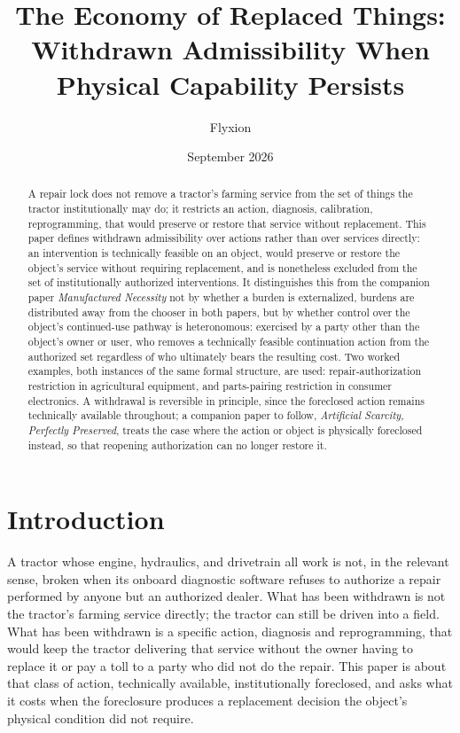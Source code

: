 \documentclass[11pt]{article}
\title{The Economy of Replaced Things: Withdrawn Admissibility When Physical Capability Persists}
\author{Flyxion}
\affil{Independent Researcher}
\date{September 2026}
\begin{document}
\maketitle

\begin{abstract}
A repair lock does not remove a tractor's farming service from the set of things the tractor institutionally may do; it restricts an action, diagnosis, calibration, reprogramming, that would preserve or restore that service without replacement. This paper defines withdrawn admissibility over actions rather than over services directly: an intervention is technically feasible on an object, would preserve or restore the object's service without requiring replacement, and is nonetheless excluded from the set of institutionally authorized interventions. It distinguishes this from the companion paper \emph{Manufactured Necessity} not by whether a burden is externalized, burdens are distributed away from the chooser in both papers, but by whether control over the object's continued-use pathway is heteronomous: exercised by a party other than the object's owner or user, who removes a technically feasible continuation action from the authorized set regardless of who ultimately bears the resulting cost. Two worked examples, both instances of the same formal structure, are used: repair-authorization restriction in agricultural equipment, and parts-pairing restriction in consumer electronics. A withdrawal is reversible in principle, since the foreclosed action remains technically available throughout; a companion paper to follow, \emph{Artificial Scarcity, Perfectly Preserved}, treats the case where the action or object is physically foreclosed instead, so that reopening authorization can no longer restore it.
\end{abstract}

\section{Introduction}

A tractor whose engine, hydraulics, and drivetrain all work is not, in the relevant sense, broken when its onboard diagnostic software refuses to authorize a repair performed by anyone but an authorized dealer. What has been withdrawn is not the tractor's farming service directly; the tractor can still be driven into a field. What has been withdrawn is a specific action, diagnosis and reprogramming, that would keep the tractor delivering that service without the owner having to replace it or pay a toll to a party who did not do the repair. This paper is about that class of action, technically available, institutionally foreclosed, and asks what it costs when the foreclosure produces a replacement decision the object's physical condition did not require.
\end{document}
